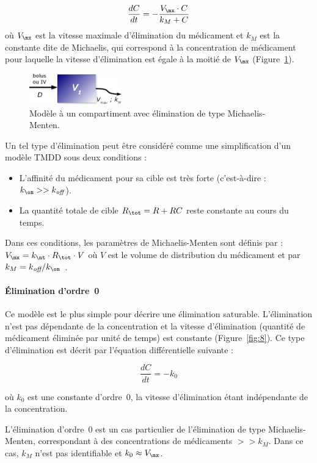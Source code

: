 \begin{equation}
\frac{dC}{dt}=-\frac{V_{\mx}\cdot C}{k_M + C}
\label{eq:34}
\end{equation}
où $V_{\mx}$ est la vitesse maximale d'élimination du médicament et $k_M$ est la constante dite de Michaelis, qui correspond à la concentration de médicament pour laquelle la vitesse d'élimination est égale à la moitié de $V_{\mx}$ (Figure~\ref{fig:7}).

\begin{figure}[htbp]
	\centering
		\includegraphics[width=4cm]{figures/raster/FIG_7}
	\caption{Modèle à un compartiment avec élimination de type Michaelis-Menten.}
	\label{fig:7}
\end{figure}

Un tel type d'élimination peut être considéré comme une simplification d'un modèle TMDD sous deux conditions :
\begin{itemize}
\item L'affinité du médicament pour sa cible est très forte (c'est-à-dire : $k_{\on} >> k_{\off}$).
\item La quantité totale de cible $R_{\tot} =  R + RC$ reste constante au cours du temps.
\end{itemize}
Dans ces conditions, les paramètres de Michaelis-Menten sont définis par : $V_{\mx} = k_{\nt}\cdot R_{\tot}\cdot V$ où $V$ est le volume de distribution du médicament et par $k_M = k_{\off} /k_{\on}$~\citep{REF4, REF6}.
\paragraph{Élimination d'ordre~0} Ce modèle est le plus simple pour décrire une élimination saturable. L'élimination n'est pas dépendante de la concentration et la vitesse d'élimination (quantité de médicament éliminée par unité de temps) est constante (Figure~\ref{fig:8}). Ce type d'élimination est décrit par l'équation différentielle suivante :

\begin{equation}
\frac{dC}{dt}=-k_0
\label{eq:35}
\end{equation}

où $k_0$ est une constante d'ordre~0, la vitesse d'élimination étant indépendante de la concentration.

L'élimination d'ordre~0 est un cas particulier de l'élimination de type Michaelis-Menten, correspondant à des concentrations de médicaments $>> k_M$. Dans ce cas, $k_M$ n'est pas identifiable et $k_0 \approx V_{\mx}$.

